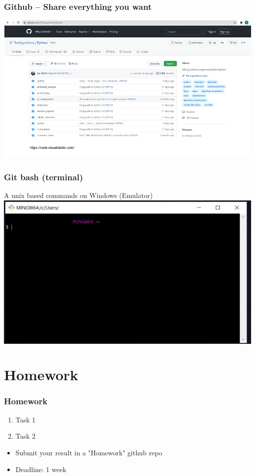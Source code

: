 \documentclass{beamer}
\begin{document}
\begin{frame}
    \frametitle{Github – Share everything you want}
    \centering
    \includegraphics[scale = 0.5]{figures/github.jpg}
\end{frame}

\begin{frame}
    \frametitle{Git bash (terminal)}
    A unix based commands on Windows (Emulator)
    \centering
    \includegraphics[scale = 0.5]{figures/git_bash.jpg}
\end{frame}


\section{Homework} 

\begin{frame}
    \frametitle{Homework}
    \begin{enumerate}
        \item Task 1
        \item Task 2
    \end{enumerate}
\vskip 2mm
    \begin{itemize}
        \item Submit your result in a "Homework" github repo
        \item Deadline: 1 week%
    \end{itemize}

\end{frame}
\end{document}
